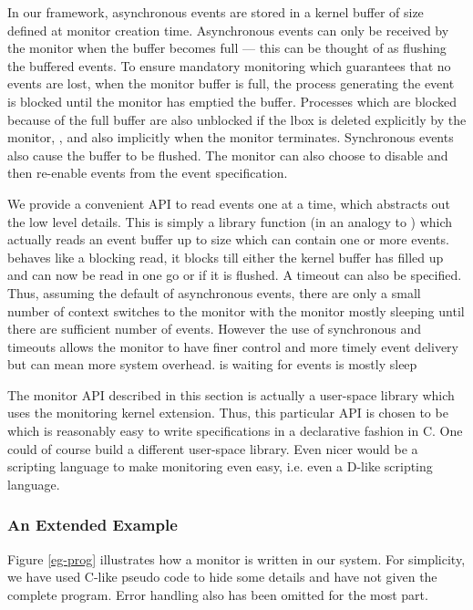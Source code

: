 In our framework, asynchronous events are stored in a kernel buffer
of size  defined at monitor creation time. Asynchronous events
can only be received by the monitor when the buffer becomes full --- this
can be thought of as flushing the buffered events.
To ensure mandatory monitoring which guarantees that no events are lost, 
when the monitor buffer is full, the process generating the event 
is blocked until the monitor has emptied the buffer.
Processes which are blocked because of the full buffer are also unblocked
if the lbox is deleted explicitly by the monitor, ,
and also implicitly when the monitor terminates.
Synchronous events also cause the buffer to be flushed.
The monitor can also choose to disable and then re-enable events from
the event specification. 

We provide a convenient API to read events one at a time,
 which abstracts out the low level details.
This is simply a library function (in an analogy to ) which
actually reads an event buffer up to size  which can
contain one or more events. 
 behaves like a blocking read, it blocks
till either the kernel buffer has filled up and can now be read
in one go or if it is flushed. A timeout can also be specified.
Thus, assuming the default of asynchronous events, there are only a small
number of context switches to the monitor with the monitor mostly sleeping
until there are sufficient number of events. However the use of synchronous
and timeouts allows the monitor to have finer control and more timely
event delivery but can mean more system overhead.
is waiting for events is mostly sleep

The monitor API described in this section is actually a user-space library
which uses the monitoring kernel extension. Thus, this particular
API is chosen to be which is reasonably easy to write specifications
in a declarative fashion in C.
One could of course build a different user-space library.
Even nicer would be a scripting language to make monitoring even easy,
i.e. even a D-like scripting language.

\subsubsection{An Extended Example}
\label{sec-eg}

Figure \ref{eg-prog} illustrates how a monitor is written in our system.
For simplicity, we have used C-like pseudo code to
hide some details and have not given the complete program.
Error handling also has been omitted for the most part.

